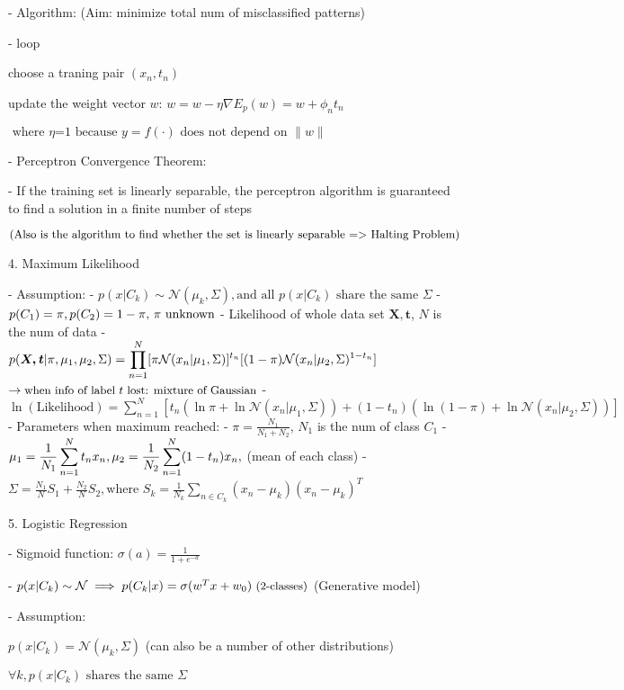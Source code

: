 - Algorithm: (Aim: minimize total num of misclassified patterns)

- loop 

	choose a traning pair $(x_n, t_n)$ 

	update the weight vector $w$: $w  = w - \eta \nabla E_p(w) = w+\phi_nt_n$ 

		$\text{ where $\eta$=1 because $y=f(\cdot)$ does not depend on $\|w\|$}$ 

- Perceptron Convergence Theorem:

- If the training set is linearly separable, the perceptron algorithm is guaranteed
to find a solution in a finite number of steps

$\small \text{(Also is the algorithm to find whether the set is linearly separable => Halting Problem)}$ 

4. Maximum Likelihood

- Assumption: 
- $p(x|C_k) \sim\mathcal{N}(\mu_k,\Sigma), \text{and all } p(x|C_k) \text{ share the same } \Sigma$ 
- \(p(C_1) = \pi,\space p(C_2)=1-\pi \text{, $\pi$ unknown}\) 
- Likelihood of whole data set $\boldsymbol{X,t}$, $N$ is the num of data
- $\displaystyle p(\boldsymbol{X,t}|\pi, \mu_1, \mu_2, \Sigma) = \prod_{n=1}^N[\pi\mathcal{N}(x_n|\mu_1,\Sigma)]^{t_n} \space [(1-\pi)\mathcal{N}(x_n|\mu_2, \Sigma)^{1-t_n}]$ $\space\small\rightarrow\text{when info of label $t$ lost: mixture of Gaussian}$  
- $\displaystyle \ln (\text{Likelihood}) = \sum_{n=1}^N[t_n(\ln\pi+\ln\mathcal{N}(x_n|\mu_1,\Sigma)) + (1-t_n)(\ln(1-\pi)+\ln\mathcal{N}(x_n|\mu_2, \Sigma))]$ 
- Parameters when maximum reached:
- $\displaystyle \pi = \frac {N_1}{N_1+N_2}$, $N_1$ is the num of class $C_1$ 
- $\displaystyle \mu_1 = \frac 1 {N_1} \sum_{n=1}^Nt_n x_n, \space \mu_2=\frac 1 {N_2}\sum_{n=1}^N(1-t_n)x_n,$ (mean of each class)
- $\displaystyle \Sigma = \frac {N_1}{N}S_1 + \frac {N_2}NS_2, \text {where } S_k = \frac 1 {N_k}\sum_{n \in C_k}(x_n-\mu_k)(x_n-\mu_k)^T $ 

5. Logistic Regression 

- Sigmoid function: $\displaystyle \sigma(a) = \frac 1 {1+e^{-a}}$ 

- $p(x|C_k) \sim \mathcal{N} \implies p(C_k|x)=\sigma(w^Tx+w_0) \small \text{ (2-classes)}$  (Generative model)

- Assumption:

$p(x|C_k) = \mathcal{N}(\mu_k, \Sigma)$ (can also be a number of other distributions)

$\forall k, p(x|C_k) \text{ shares the same } \Sigma$ 

